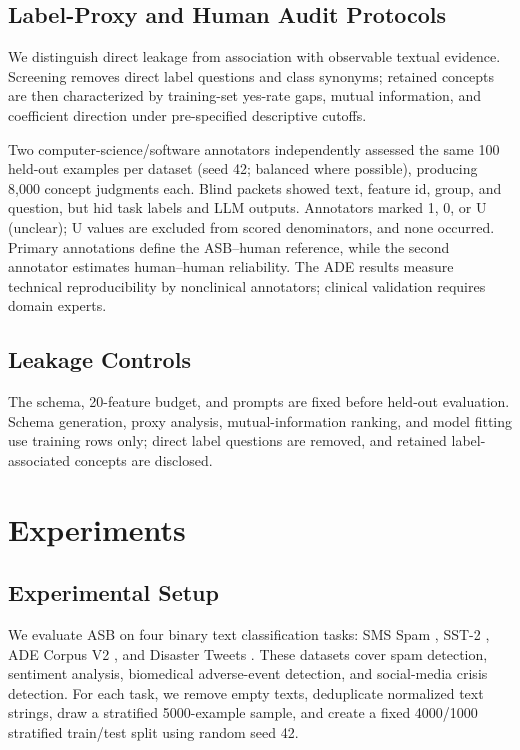 \documentclass[runningheads]{llncs}
\begin{document}
\subsection{Label-Proxy and Human Audit Protocols}
\label{sec:label-proxy}

We distinguish direct leakage from association with observable textual evidence. Screening removes direct label questions and class synonyms; retained concepts are then characterized by training-set yes-rate gaps, mutual information, and coefficient direction under pre-specified descriptive cutoffs.

Two computer-science/software annotators independently assessed the same 100 held-out examples per dataset (seed 42; balanced where possible), producing 8,000 concept judgments each. Blind packets showed text, feature id, group, and question, but hid task labels and LLM outputs. Annotators marked 1, 0, or U (unclear); U values are excluded from scored denominators, and none occurred. Primary annotations define the ASB--human reference, while the second annotator estimates human--human reliability. The ADE results measure technical reproducibility by nonclinical annotators; clinical validation requires domain experts.

\subsection{Leakage Controls}

The schema, 20-feature budget, and prompts are fixed before held-out evaluation. Schema generation, proxy analysis, mutual-information ranking, and model fitting use training rows only; direct label questions are removed, and retained label-associated concepts are disclosed.

\section{Experiments}
\label{sec:experiments}

\subsection{Experimental Setup}

We evaluate ASB on four binary text classification tasks: SMS Spam \cite{almeida2011contributions}, SST-2 \cite{socher2013recursive}, ADE Corpus V2 \cite{gurulingappa2012extraction}, and Disaster Tweets \cite{kaggle_disaster_tweets}. These datasets cover spam detection, sentiment analysis, biomedical adverse-event detection, and social-media crisis detection. For each task, we remove empty texts, deduplicate normalized text strings, draw a stratified 5000-example sample, and create a fixed 4000/1000 stratified train/test split using random seed 42.
\end{document}

